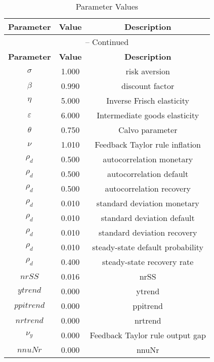 \begin{center}
\begin{longtable}{ccc}
\caption{Parameter Values}\\%
\toprule%
\multicolumn{1}{c}{\textbf{Parameter}} &
\multicolumn{1}{c}{\textbf{Value}} &
 \multicolumn{1}{c}{\textbf{Description}}\\%
\midrule%
\endfirsthead
\multicolumn{3}{c}{{\tablename} \thetable{} -- Continued}\\%
\midrule%
\multicolumn{1}{c}{\textbf{Parameter}} &
\multicolumn{1}{c}{\textbf{Value}} &
  \multicolumn{1}{c}{\textbf{Description}}\\%
\midrule%
\endhead
$\sigma$ 	 & 	 1.000 	 & 	 risk aversion\\
$\beta$ 	 & 	 0.990 	 & 	 discount factor\\
$\eta$ 	 & 	 5.000 	 & 	 Inverse Frisch elasticity\\
$\varepsilon$ 	 & 	 6.000 	 & 	 Intermediate goods elasticity\\
$\theta$ 	 & 	 0.750 	 & 	 Calvo parameter\\
$\nu$ 	 & 	 1.010 	 & 	 Feedback Taylor rule inflation\\
$\rho_d$ 	 & 	 0.500 	 & 	 autocorrelation monetary\\
$\rho_d$ 	 & 	 0.500 	 & 	 autocorrelation default\\
$\rho_d$ 	 & 	 0.500 	 & 	 autocorrelation recovery\\
$\rho_d$ 	 & 	 0.010 	 & 	 standard deviation monetary\\
$\rho_d$ 	 & 	 0.010 	 & 	 standard deviation default\\
$\rho_d$ 	 & 	 0.010 	 & 	 standard deviation recovery\\
$\rho_d$ 	 & 	 0.010 	 & 	 steady-state default probability\\
$\rho_d$ 	 & 	 0.400 	 & 	 steady-state recovery rate\\
$nrSS$ 	 & 	 0.016 	 & 	 nrSS\\
$ytrend$ 	 & 	 0.000 	 & 	 ytrend\\
$ppitrend$ 	 & 	 0.000 	 & 	 ppitrend\\
$nrtrend$ 	 & 	 0.000 	 & 	 nrtrend\\
$\nu_y$ 	 & 	 0.000 	 & 	 Feedback Taylor rule output gap\\
$nnuNr$ 	 & 	 0.000 	 & 	 nnuNr\\
\bottomrule%
\end{longtable}
\end{center}
